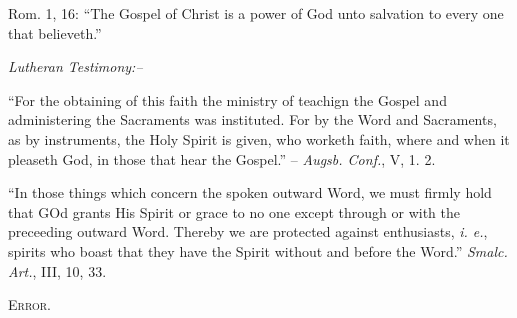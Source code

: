 \documentclass[
]{book}
\begin{document}
Rom. 1, 16: ``The Gospel of Christ is a power of God unto salvation to every one that believeth.''

\begin{center}
\textsl{Lutheran Testimony:--}
\end{center}

``For the obtaining of this faith the ministry of teachign the Gospel and administering the Sacraments was instituted. For by the Word and Sacraments, as by instruments, the Holy Spirit is given, who worketh faith, where and when it pleaseth God, in those that hear the Gospel.'' -- \emph{Augsb. Conf.}, V, 1. 2.

``In those things which concern the spoken outward Word, we must firmly hold that GOd grants His Spirit or grace to no one except through or with the preceeding outward Word. Thereby we are protected against enthusiasts, \emph{i. e.}, spirits who boast that they have the Spirit without and before the Word.'' \emph{Smalc. Art.}, III, 10, 33.

\begin{center}
\textsc{Error.}
\end{center}
\end{document}
